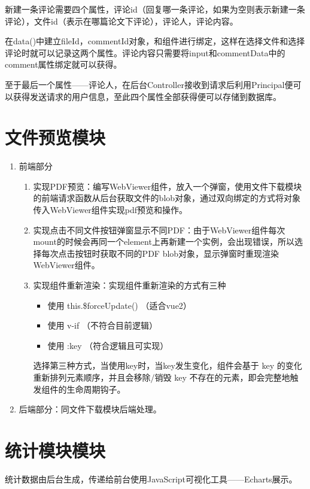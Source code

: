 新建一条评论需要四个属性，评论id（回复哪一条评论，如果为空则表示新建一条评论），文件id（表示在哪篇论文下评论），评论人，评论内容。

在data()中建立fileId，commentId对象，和组件进行绑定，这样在选择文件和选择评论时就可以记录这两个属性。评论内容只需要将input和commentData中的comment属性绑定就可以获得。

至于最后一个属性——评论人，在后台Controller接收到请求后利用Principal便可以获得发送请求的用户信息，至此四个属性全部获得便可以存储到数据库。

\section{文件预览模块}

\begin{enumerate}
  \item 前端部分
  \begin{enumerate}
    \item 实现PDF预览：编写WebViewer组件，放入一个弹窗，使用文件下载模块的前端请求函数从后台获取文件的blob对象，通过双向绑定的方式将对象传入WebViewer组件实现pdf预览和操作。
    \item 实现点击不同文件按钮弹窗显示不同PDF：由于WebViewer组件每次mount的时候会再同一个element上再新建一个实例，会出现错误，所以选择每次点击按钮时获取不同的PDF blob对象，显示弹窗时重现渲染WebViewer组件。
    \item 实现组件重新渲染：实现组件重新渲染的方式有三种
    \begin{itemize}
      \item 使用 this.\$forceUpdate() （适合vue2）
      \item 使用 v-if （不符合目前逻辑）
      \item 使用 :key （符合逻辑且可实现）
    \end{itemize}
    选择第三种方式，当使用key时，当key发生变化，组件会基于 key 的变化重新排列元素顺序，并且会移除/销毁 key 不存在的元素，即会完整地触发组件的生命周期钩子。
  \end{enumerate}
  \item 后端部分：同文件下载模块后端处理。
\end{enumerate}


\section{统计模块模块}

统计数据由后台生成，传递给前台使用JavaScript可视化工具——Echarts展示。

